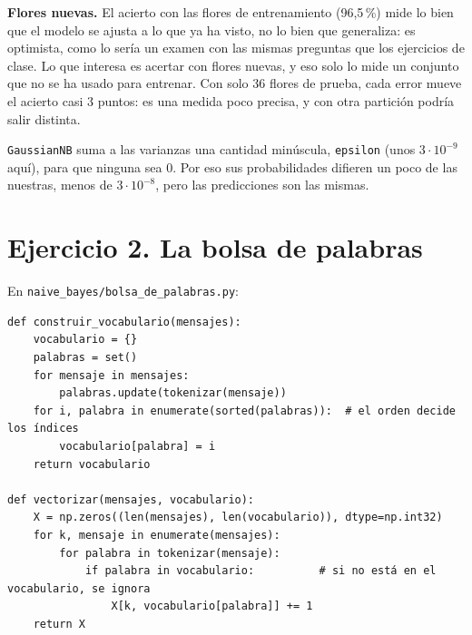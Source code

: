 \documentclass{article}
\begin{document}
\begin{enumerate}
    \textbf{Flores nuevas.} El acierto con las flores de entrenamiento (96,5\,\%) mide lo bien que el modelo se ajusta a lo que ya ha visto, no lo bien que generaliza: es optimista, como lo sería un examen con las mismas preguntas que los ejercicios de clase. Lo que interesa es acertar con flores nuevas, y eso solo lo mide un conjunto que no se ha usado para entrenar. Con solo 36 flores de prueba, cada error mueve el acierto casi 3 puntos: es una medida poco precisa, y con otra partición podría salir distinta.

    \texttt{GaussianNB} suma a las varianzas una cantidad minúscula, \texttt{epsilon} (unos $3 \cdot 10^{-9}$ aquí), para que ninguna sea 0. Por eso sus probabilidades difieren un poco de las nuestras, menos de $3 \cdot 10^{-8}$, pero las predicciones son las mismas.
\end{enumerate}

\section*{Ejercicio 2. La bolsa de palabras}
En \texttt{naive\_bayes/bolsa\_de\_palabras.py}:
\begin{lstlisting}
def construir_vocabulario(mensajes):
    vocabulario = {}
    palabras = set()
    for mensaje in mensajes:
        palabras.update(tokenizar(mensaje))
    for i, palabra in enumerate(sorted(palabras)):  # el orden decide los índices
        vocabulario[palabra] = i
    return vocabulario

def vectorizar(mensajes, vocabulario):
    X = np.zeros((len(mensajes), len(vocabulario)), dtype=np.int32)
    for k, mensaje in enumerate(mensajes):
        for palabra in tokenizar(mensaje):
            if palabra in vocabulario:          # si no está en el vocabulario, se ignora
                X[k, vocabulario[palabra]] += 1
    return X
\end{lstlisting}
\end{document}
